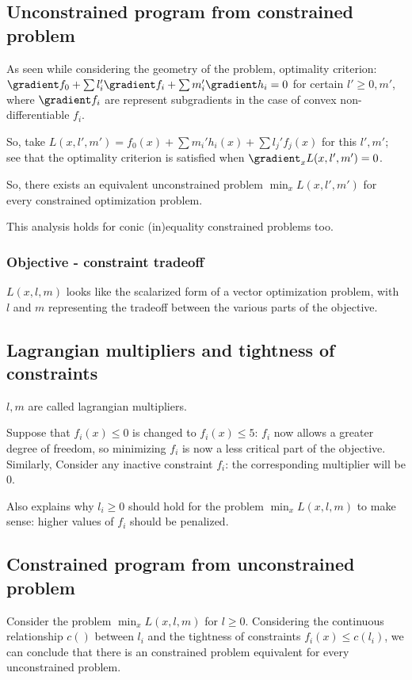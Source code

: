 \documentclass[oneside, article]{memoir}
\begin{document}
\subsection{Unconstrained program from constrained problem}
As seen while considering the geometry of the problem, optimality criterion: $\gradient f_0 + \sum l_i' \gradient f_i + \sum m_i' \gradient h_i = 0$ for certain $l'\geq 0, m'$, where $\gradient f_i$ are represent subgradients in the case of convex non-differentiable $f_i$.

So, take $L(x, l', m') = f_{0}(x) + \sum m_{i}'h_{i}(x) + \sum l_{j}'f_{j}(x)$ for this $l', m'$; see that the optimality criterion is satisfied when $\gradient_x L(x, l', m') = 0$.

So, there exists an equivalent unconstrained problem $\min_x L(x, l', m')$ for every constrained optimization problem. 

This analysis holds for conic (in)equality constrained problems too.

\subsubsection{Objective - constraint tradeoff}
$L(x, l, m)$ looks like the scalarized form of a vector optimization problem, with $l$ and $m$ representing the tradeoff between the various parts of the objective.

\subsection{Lagrangian multipliers and tightness of constraints}
$l, m$ are called lagrangian multipliers. 

Suppose that $f_i(x) \leq 0$ is changed to $f_i(x) \leq 5$: $f_i$ now allows a greater degree of freedom, so minimizing $f_i$ is now a less critical part of the objective. Similarly, Consider any inactive constraint $f_i$: the corresponding multiplier will be 0.

Also explains why $l_i \geq 0$ should hold for the problem $\min_x L(x, l, m)$ to make sense: higher values of $f_i$ should be penalized.

\subsection{Constrained program from unconstrained problem}
Consider the problem $\min_x L(x, l, m)$ for $l\geq 0$. Considering the continuous relationship $c()$ between $l_i$ and the tightness of constraints $f_i(x) \leq c(l_i)$, we can conclude that there is an constrained problem equivalent for every unconstrained problem.
\end{document}
